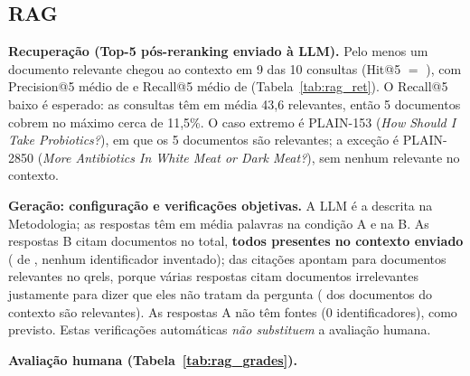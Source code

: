 \subsection{RAG}
\textbf{Recuperação (Top-5 pós-reranking enviado à LLM).} Pelo menos um documento relevante chegou ao contexto em 9 das 10 consultas (Hit@5 $=$ \RagHit), com Precision@5 médio de \RagPrec{} e Recall@5 médio de \RagRecall{} (Tabela~\ref{tab:rag_ret}). O Recall@5 baixo é esperado: as consultas têm em média 43,6 relevantes, então 5 documentos cobrem no máximo cerca de 11,5\%. O caso extremo é PLAIN-153 (\emph{How Should I Take Probiotics?}), em que os 5 documentos são relevantes; a exceção é PLAIN-2850 (\emph{More Antibiotics In White Meat or Dark Meat?}), sem nenhum relevante no contexto.


\textbf{Geração: configuração e verificações objetivas.} A LLM é a descrita na Metodologia; as respostas têm em média \RagWordsA{} palavras na condição A e \RagWordsB{} na B. As respostas B citam \RagCited{} documentos no total, \textbf{todos presentes no contexto enviado} (\RagCitedValid{} de \RagCited{}, nenhum identificador inventado); \RagCitedRel{} das citações apontam para documentos relevantes no qrels, porque várias respostas citam documentos irrelevantes justamente para dizer que eles não tratam da pergunta (\RagCtxRel{} dos \RagCtxN{} documentos do contexto são relevantes). As respostas A não têm fontes (0 identificadores), como previsto. Estas verificações automáticas \emph{não substituem} a avaliação humana.

\textbf{Avaliação humana (Tabela~\ref{tab:rag_grades}).} 


